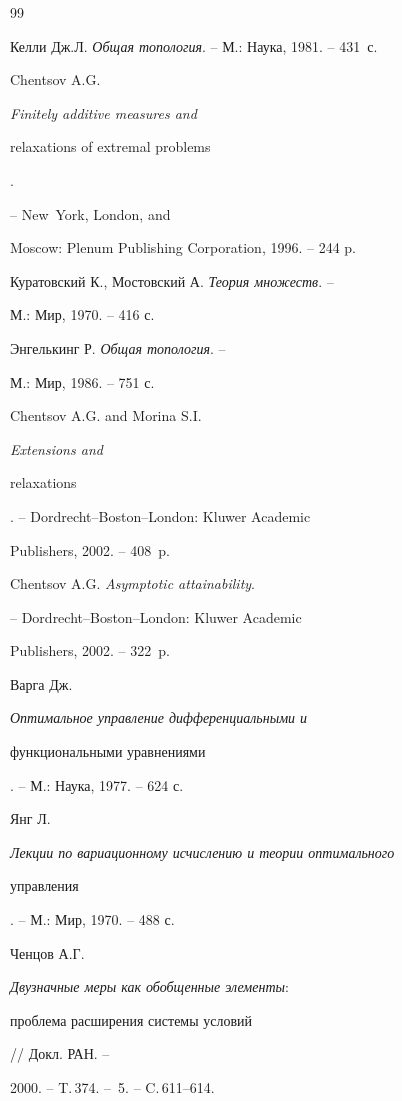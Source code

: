 {\begin{thebibliography}{99}







Келли Дж.Л. {\em Общая топология}. -- М.: Наука, 1981. -- 431~с.




Chentsov A.G.  {\em Finitely additive measures and


relaxations of extremal problems}.


-- New~York, London, and


Moscow: Plenum Publishing Corporation, 1996. -- 244 p.




Куратовский К., Мостовский А.  {\em Теория множеств}. --


М.: Мир, 1970. -- 416 с.




Энгелькинг Р. {\em Общая топология}. --


М.: Мир, 1986. -- 751 с.




Chentsov A.G. and Morina S.I. {\em Extensions and


relaxations}. -- Dordrecht--Boston--London: Kluwer Academic


Publishers, 2002. -- 408~p.




Chentsov A.G.  {\em Asymptotic attainability}.


-- Dordrecht--Boston--London: Kluwer Academic


Publishers, 2002. -- 322~p.




Варга Дж. {\em Оптимальное управление дифференциальными и


функциональными уравнениями}. -- М.: Наука, 1977. -- 624 с.




Янг Л. {\em Лекции по вариационному исчислению и теории оптимального


управления}. -- М.: Мир, 1970. -- 488 с.




Ченцов А.Г. {\em Двузначные меры как обобщенные элементы\/${:}$


проблема расширения системы условий} // Докл. РАН. --


2000. -- T.\,374. -- \No\,5. -- C.\,611--614.



\end{thebibliography}}
